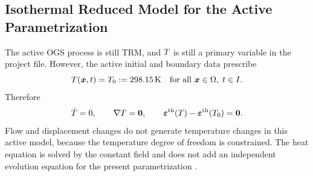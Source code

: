 

\subsection{Isothermal Reduced Model for the Active Parametrization}
\label{sec:isothermal-reduced-model}

The active OGS process is still TRM, and \(T\) is still a primary variable in the
project file.  However, the active initial and boundary data prescribe
\begin{equation}
  T(\bm{x},t)=T_0:=298.15\,\mathrm{K}
  \quad \text{for all } \bm{x}\in\Omega,\; t\in I .
  \label{eq:isothermal-constraint}
\end{equation}
Therefore
\begin{equation}
  \dot{T}=0,
  \qquad
  \nabla T=\bm{0},
  \qquad
  \bm{\varepsilon}^{\mathrm{th}}(T)-\bm{\varepsilon}^{\mathrm{th}}(T_0)=\bm{0}.
  \label{eq:isothermal-zero-terms}
\end{equation}
Flow and displacement changes do not generate temperature changes in this active
model, because the temperature degree of freedom is constrained.  The heat equation
is solved by the constant field and does not add an independent evolution equation
for the present parametrization
\citep[TRM heat equation and process-variable list]{OpenGeoSysTRMDocs}.

